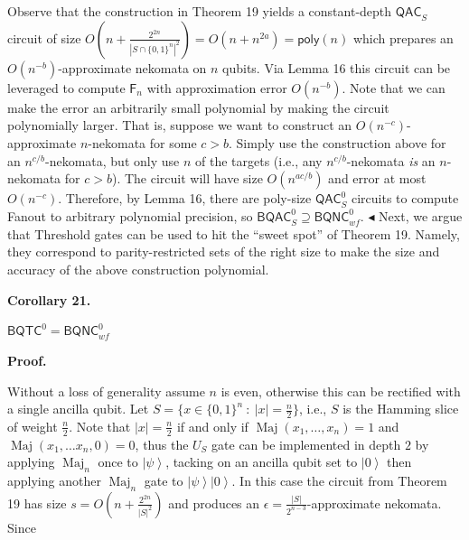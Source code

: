 Observe that the construction in Theorem 19 yields a constant-depth ${\mathsf{QAC}}_{S}$ circuit of size $O(n+\frac{2^{2n}}{|S\cap\{0,1\}^{n}|^{2}})=O(n+n^{2a})={\mathsf{poly}}(n)$ which prepares an $O(n^{-b})$-approximate nekomata on $n$ qubits. Via Lemma 16 this circuit can be leveraged to compute $\mathsf{F}_{n}$ with approximation error $O(n^{-b})$. Note that we can make the error an arbitrarily small polynomial by making the circuit polynomially larger. That is, suppose we want to construct an $O(n^{-c})$-approximate $n$-nekomata for some $c>b$. Simply use the construction above for an $n^{c/b}$-nekomata, but only use $n$ of the targets (i.e., any $n^{c/b}$-nekomata \emph{is} an $n$-nekomata for $c>b$). The circuit will have size $O(n^{ac/b})$ and error at most $O(n^{-c})$. Therefore, by Lemma 16, there are poly-size ${\mathsf{QAC}}_{S}^{0}$ circuits to compute Fanout to arbitrary polynomial precision, so ${\mathsf{BQAC}}^{0}_{S}\supseteq{\mathsf{BQNC}}^{0}_{wf}$.
$\blacktriangleleft$
Next, we argue that Threshold gates can be used to hit the “sweet spot” of Theorem 19. Namely, they correspond to parity-restricted sets of the right size to make the size and accuracy of the above construction polynomial.\par





\par\medskip\noindent\textbf{
\textbf{Corollary 21}\textbf{.}
}\par



${\mathsf{BQTC}}^{0}={\mathsf{BQNC}}^{0}_{wf}$\emph{}\par







\par\medskip\noindent\textbf{Proof.}\par




Without a loss of generality assume $n$ is even, otherwise this can be rectified with a single ancilla qubit. Let $S=\{x\in\{0,1\}^{n}\ :\ |x|=\frac{n}{2}\}$, i.e., $S$ is the Hamming slice of weight $\frac{n}{2}$. Note that $|x|=\frac{n}{2}$ if and only if $\operatorname{Maj}(x_{1},\dots,x_{n})=1$ and $\operatorname{Maj}(x_{1},\dots x_{n},0)=0$, thus the $U_{S}$ gate can be implemented in depth $2$ by applying $\operatorname{Maj}_{n}$ once to $\left|\psi\right\rangle$, tacking on an ancilla qubit set to $\left|0\right\rangle$ then applying another $\operatorname{Maj}_{n}$ gate to $\left|\psi\right\rangle\left|0\right\rangle$. In this case the circuit from Theorem 19 has size $s=O(n+\frac{2^{2n}}{|S|^{2}})$ and produces an $\epsilon=\frac{|S|}{2^{n-3}}$-approximate nekomata. Since\par



